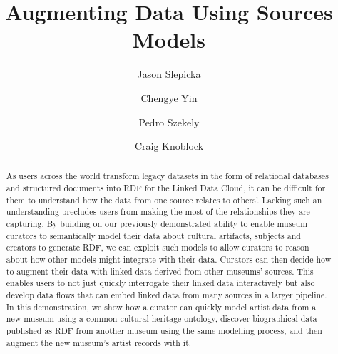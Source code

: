 \documentclass[runningheads,a4paper]{llncs}
\begin{document}
\mainmatter  %

\title{Augmenting Data Using Sources Models}


%
\author{Jason Slepicka%
\and Chengye Yin\and Pedro Szekely\and Craig Knoblock}
%


\maketitle


\begin{abstract}
As users across the world transform legacy datasets in the form of relational databases and structured documents into RDF for the Linked Data Cloud, it can be difficult for them to understand how the data from one source relates to others'.
Lacking such an understanding precludes users from making the most of the relationships they are capturing. 
By building on our previously demonstrated ability to enable museum curators to semantically model their data about cultural artifacts, subjects and creators to generate RDF, we can exploit such models to allow curators to reason about how other models might integrate with their data.  
Curators can then decide how to augment their data with linked data derived from other museums' sources.
This enables users to not just quickly interrogate their linked data interactively but also develop data flows that can embed linked data from many sources in a larger pipeline. In this demonstration, we show how a curator can quickly model artist data from a new museum using a common cultural heritage ontology, discover biographical data published as RDF from another museum using the same modelling process, and then augment the new museum's artist records with it.  
\end{abstract}
\end{document}
